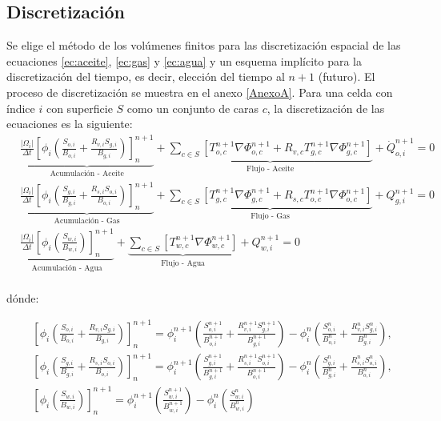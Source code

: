 \subsection{Discretización}\label{subsec:Discretization}

Se elige el método de los volúmenes finitos para las discretización espacial de las ecuaciones \ref{ec:aceite}, \ref{ec:gas} y \ref{ec:agua} y un esquema implícito para la discretización del tiempo, es decir, elección del tiempo al $n+1$ (futuro). El proceso de discretización se muestra en el anexo \ref{AnexoA}. Para una celda con índice $i$ con superficie $S$ como un conjunto de caras $c$, la discretización de las ecuaciones es la siguiente:
\begin{align}
\label{ec:aceiteDiscretizacion}&\underbrace{\frac{|\Omega_{i}|}{\Delta t}\left[ \phi_{i} \left( \frac{S_{o,i}}{B_{o,i}} + \frac{R_{v,i}S_{g,i}}{B_{g,i}}\right)\right]^{n+1}_{n}}_{\text{Acumulación - Aceite}} + 
\underbrace{\sum_{c \in S}\left[ T^{n+1}_{o,c} \nabla{\Phi_{o,c}^{n+1}} + R_{v,c}T^{n+1}_{g,c} \nabla{\Phi_{g,c}^{n+1}} \right] }_{\text{Flujo - Aceite}}+ \dot{Q}_{o,i}^{n+1} = 0 \\
\label{ec:gasDiscretizacion}&\underbrace{\frac{|\Omega_{i}|}{\Delta t}\left[ \phi_{i} \left( \frac{S_{g,i}}{B_{g,i}} + \frac{R_{s,i}S_{o,i}}{B_{o,i}}\right)\right]^{n+1}_{n}}_{\text{Acumulación - Gas}} + 
\underbrace{\sum_{c \in S}\left[ T^{n+1}_{g,c}\nabla{\Phi_{g,c}^{n+1} + R_{s,c}T^{n+1}_{o,c} \nabla{\Phi_{o,c}^{n+1}}} \right] }_{\text{Flujo - Gas}}+ Q_{g,i}^{n+1} = 0 \\
\label{ec:aguaDiscretizacion}&\underbrace{\frac{|\Omega_{i}|}{\Delta t}\left[ \phi_{i} \left( \frac{S_{w,i}}{B_{w,i}}\right)\right]^{n+1}_{n}}_{\text{Acumulación - Agua}}
+ 
\underbrace{\sum_{c \in S}\left[ T^{n+1}_{w,c}\nabla{\Phi_{w,c}^{n+1}} \right]}_{\text{Flujo - Agua}} + Q_{w,i}^{n+1} = 0 
\end{align}\\

dónde:

\begin{align*}
	&\left[ \phi_{i} \left( \frac{S_{o,i}}{B_{o,i}} + \frac{R_{v,i}S_{g,i}}{B_{g,i}}\right)\right]^{n+1}_{n} = 
	\phi^{n+1}_{i} \left( \frac{S_{o,i}^{n+1}}{B_{o,i}^{n+1}} + \frac{R_{v,i}^{n+1}S_{g,i}^{n+1}}{B_{g,i}^{n+1}}\right) - \phi^{n}_{i} \left( \frac{S_{o,i}^{n}}{B_{o,i}^{n}} + \frac{R_{v,i}^{n}S_{g,i}^{n}}{B_{g,i}^{n}}\right),\\
	&\left[ \phi_{i} \left( \frac{S_{g,i}}{B_{g,i}} + \frac{R_{s,i}S_{o,i}}{B_{o,i}}\right)\right]^{n+1}_{n} = 
	\phi^{n+1}_{i} \left( \frac{S_{g,i}^{n+1}}{B_{g,i}^{n+1}} + \frac{R_{s,i}^{n+1}S_{o,i}^{n+1}}{B_{o,i}^{n+1}}\right) - \phi^{n}_{i} \left( \frac{S_{g,i}^{n}}{B_{g,i}^{n}} + \frac{R_{s,i}^{n}S_{o,i}^{n}}{B_{o,i}^{n}}\right),\\
	&\left[ \phi_{i} \left( \frac{S_{w,i}}{B_{w,i}}\right)\right]^{n+1}_{n} = 
	\phi^{n+1}_{i} \left( \frac{S_{w,i}^{n+1}}{B_{w,i}^{n+1}}\right) - \phi^{n}_{i} \left( \frac{S_{w,i}^{n}}{B_{w,i}^{n}}\right)
\end{align*}

